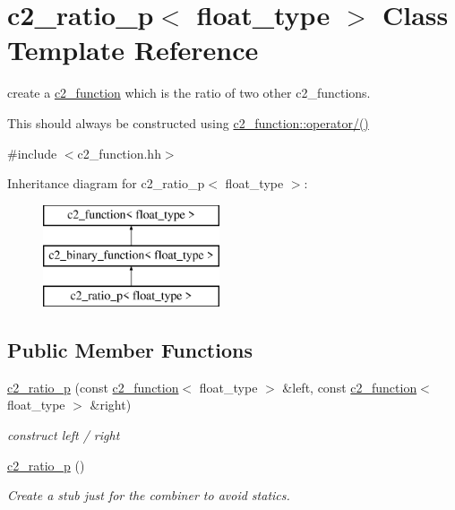 \hypertarget{classc2__ratio__p}{\section{c2\-\_\-ratio\-\_\-p$<$ float\-\_\-type $>$ Class Template Reference}
\label{classc2__ratio__p}
}


create a \hyperlink{classc2__function}{c2\-\_\-function} which is the ratio of two other c2\-\_\-functions.

This should always be constructed using \hyperlink{classc2__function_a93ac28dfe5daebea84d147b8e346e60c}{c2\-\_\-function\-::operator/()}  




{\ttfamily \#include $<$c2\-\_\-function.\-hh$>$}

Inheritance diagram for c2\-\_\-ratio\-\_\-p$<$ float\-\_\-type $>$\-:\begin{figure}[H]
\begin{center}
\leavevmode
\includegraphics[height=3.000000cm]{classc2__ratio__p}
\end{center}
\end{figure}
\subsection*{Public Member Functions}
\begin{DoxyCompactItemize}
\item 
\hyperlink{classc2__ratio__p_a0052c51dbd58b6740f9d067bd09936c5}{c2\-\_\-ratio\-\_\-p} (const \hyperlink{classc2__function}{c2\-\_\-function}$<$ float\-\_\-type $>$ \&left, const \hyperlink{classc2__function}{c2\-\_\-function}$<$ float\-\_\-type $>$ \&right)
\begin{DoxyCompactList}\small\item\em construct {\itshape left} / {\itshape right} \end{DoxyCompactList}\item 
\hypertarget{classc2__ratio__p_ab0f4ee032eee12c495dd1aaa84b767d7}{\hyperlink{classc2__ratio__p_ab0f4ee032eee12c495dd1aaa84b767d7}{c2\-\_\-ratio\-\_\-p} ()}\label{classc2__ratio__p_ab0f4ee032eee12c495dd1aaa84b767d7}

\begin{DoxyCompactList}\small\item\em Create a stub just for the combiner to avoid statics. \end{DoxyCompactList}\end{DoxyCompactItemize}
